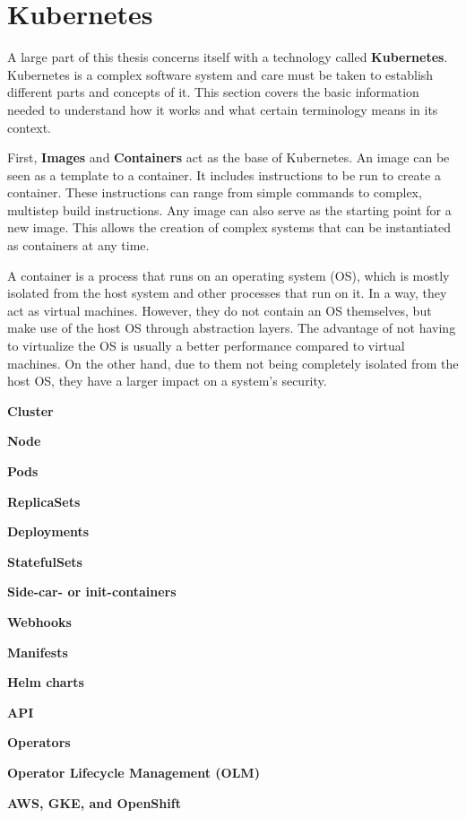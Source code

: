 \section{Kubernetes}\label{sec:kubernetes}

A large part of this thesis concerns itself with a technology called \textbf{Kubernetes}.
Kubernetes is a complex software system and care must be taken to establish different parts and concepts of it.
This section covers the basic information needed to understand how it works and what certain terminology means in its context.

First, \textbf{Images} and \textbf{Containers}\cite{docker-image} act as the base of Kubernetes.
An image can be seen as a template to a container.
It includes instructions to be run to create a container.
These instructions can range from simple commands to complex, multistep build instructions.
Any image can also serve as the starting point for a new image.
This allows the creation of complex systems that can be instantiated as containers at any time.

A container\cite{what-are-linux-containers} is a process that runs on an operating system (OS), which is mostly isolated from the host system and other processes that run on it.
In a way, they act as virtual machines.
However, they do not contain an OS themselves, but make use of the host OS through abstraction layers.
The advantage of not having to virtualize the OS is usually a better performance compared to virtual machines.
On the other hand, due to them not being completely isolated from the host OS, they have a larger impact on a system's security.

\textbf{Cluster}

\textbf{Node}

\textbf{Pods}

\textbf{ReplicaSets}

\textbf{Deployments}

\textbf{StatefulSets}

\textbf{Side-car- or init-containers}

\textbf{Webhooks}

\textbf{Manifests}

\textbf{Helm charts}

\textbf{API}

\textbf{Operators}

\textbf{Operator Lifecycle Management (OLM)}

\textbf{AWS, GKE, and OpenShift}